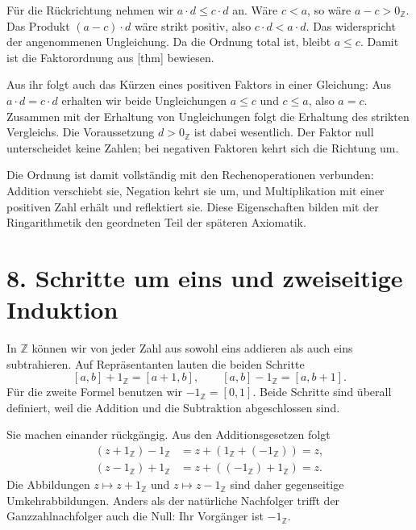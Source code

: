 Für die Rückrichtung nehmen wir \(a\cdot d\leq c\cdot d\)
an. Wäre \(c<a\), so wäre \(a-c>0_{\mathbb Z}\).
Das Produkt \((a-c)\cdot d\) wäre strikt positiv, also
\(c\cdot d<a\cdot d\). Das widerspricht der angenommenen
Ungleichung. Da die Ordnung total ist, bleibt \(a\leq c\).
Damit ist die Faktorordnung aus
[thm] bewiesen.

Aus ihr folgt auch das Kürzen eines positiven Faktors in einer
Gleichung: Aus \(a\cdot d=c\cdot d\) erhalten wir beide
Ungleichungen \(a\leq c\) und \(c\leq a\), also \(a=c\).
Zusammen mit der Erhaltung von Ungleichungen folgt die Erhaltung
des strikten Vergleichs. Die Voraussetzung \(d>0_{\mathbb Z}\)
ist dabei wesentlich. Der Faktor null unterscheidet keine Zahlen;
bei negativen Faktoren kehrt sich die Richtung um.

Die Ordnung ist damit vollständig mit den Rechenoperationen
verbunden: Addition verschiebt sie, Negation kehrt sie um, und
Multiplikation mit einer positiven Zahl erhält und reflektiert sie.
Diese Eigenschaften bilden mit der Ringarithmetik den geordneten
Teil der späteren Axiomatik.

\par{}
\hypertarget{integers.reading.induction}{}
\section*{8. Schritte um eins und zweiseitige Induktion}

In \(\mathbb Z\) können wir von jeder Zahl aus sowohl eins
addieren als auch eins subtrahieren. Auf Repräsentanten lauten die
beiden Schritte
\[
  [a,b]+1_{\mathbb Z}=[a+1,b],
  \qquad
  [a,b]-1_{\mathbb Z}=[a,b+1].
\]
Für die zweite Formel benutzen wir
\(-1_{\mathbb Z}=[0,1]\). Beide Schritte sind überall definiert,
weil die Addition und die Subtraktion abgeschlossen sind.

Sie machen einander rückgängig. Aus den Additionsgesetzen folgt
\[
  \begin{aligned}
    (z+1_{\mathbb Z})-1_{\mathbb Z}
       &=z+(1_{\mathbb Z}+(-1_{\mathbb Z}))=z,\\
    (z-1_{\mathbb Z})+1_{\mathbb Z}
       &=z+((-1_{\mathbb Z})+1_{\mathbb Z})=z.
  \end{aligned}
\]
Die Abbildungen \(z\mapsto z+1_{\mathbb Z}\) und
\(z\mapsto z-1_{\mathbb Z}\) sind daher gegenseitige
Umkehrabbildungen. Anders als der natürliche Nachfolger trifft
der Ganzzahlnachfolger auch die Null: Ihr Vorgänger ist
\(-1_{\mathbb Z}\).

